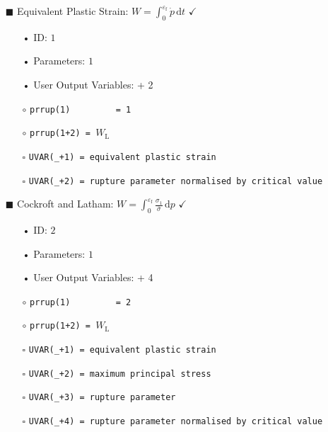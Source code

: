 \documentclass[11pt,a4paper,twoside,final,onecolumn,titlepage]{article}
\newcommand{\verified}{\hspace{0.5pt} {\LARGE $\checkmark$}}
\begin{document}
\pagebreak
\begin{itemize}
	\item[\tiny$\blacksquare$] Equivalent Plastic Strain: $\displaystyle W = \int_{0}^{\varepsilon_\textrm{f}} \dot{p}\,\text{d}t$ \verified{}
	\begin{itemize}
		\item[•] ID: $1$
		\item[•] Parameters: $1$
		\item[•] User Output Variables: + 2\\
		\item[$\circ$] \texttt{prrup(1)\,\,\,\,\,\,\,\,\,= 1}
		\item[$\circ$] \texttt{prrup(1+2) = $W_\textrm{L}$}\\
		\item[\tiny$\square$] \texttt{UVAR(\_+1) = equivalent plastic strain}
		\item[\tiny$\square$] \texttt{UVAR(\_+2) = rupture parameter normalised by critical value}\\
	\end{itemize}
\end{itemize}

\begin{itemize}
	\item[\tiny$\blacksquare$] Cockroft and Latham: $\displaystyle W =  \int_{0}^{\varepsilon_\textrm{f}}\frac{\sigma_{1}}{\bar{\sigma}}\,\text{d}p$ \verified{}
	\begin{itemize}
		\item[•] ID: $2$
		\item[•] Parameters: $1$
		\item[•] User Output Variables: + 4\\
		\item[$\circ$] \texttt{prrup(1)\,\,\,\,\,\,\,\,\,= 2}
		\item[$\circ$] \texttt{prrup(1+2) = $W_\textrm{L}$}\\
		\item[\tiny$\square$] \texttt{UVAR(\_+1) = equivalent plastic strain}
		\item[\tiny$\square$] \texttt{UVAR(\_+2) = maximum principal stress}
		\item[\tiny$\square$] \texttt{UVAR(\_+3) = rupture parameter}
		\item[\tiny$\square$] \texttt{UVAR(\_+4) = rupture parameter normalised by critical value}\\
	\end{itemize}
\end{itemize}
\end{document}
